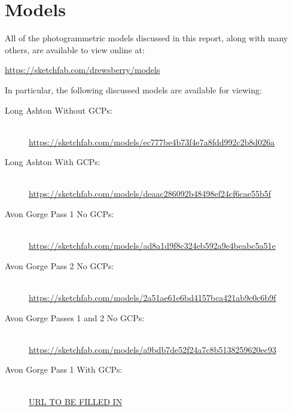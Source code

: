 \section{Models}

All of the photogrammetric models discussed in this report, along with many
others, are available to view online at:

\url{https://sketchfab.com/drewsberry/models}

In particular, the following discussed models are available for viewing:

\begin{description}
    \item[Long Ashton Without GCPs:] \hfill \\
        \url{https://sketchfab.com/models/ec777be4b73f4e7a8fdd992c2b8d026a}
    \item[Long Ashton With GCPs:] \hfill \\
        \url{https://sketchfab.com/models/deaac286092b48498ef24cf6cae55b5f}
    \item[Avon Gorge Pass 1 No GCPs:] \hfill \\
        \url{https://sketchfab.com/models/ad8a1d9f8c324eb592a9e4beabc5a51e}
    \item[Avon Gorge Pass 2 No GCPs:] \hfill \\
        \url{https://sketchfab.com/models/2a51ae61e6bd4157bca421ab9c0c6b9f}
    \item[Avon Gorge Passes 1 and 2 No GCPs:] \hfill \\
        \url{https://sketchfab.com/models/a9bdb7de52f24a7c8b5138259620ec93}
    \item[Avon Gorge Pass 1 With GCPs:] \hfill \\
        \url{URL TO BE FILLED IN}
\end{description}
